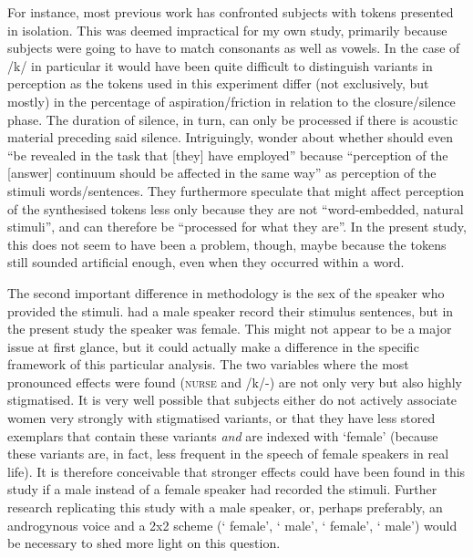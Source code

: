 For instance, most previous work has confronted subjects with   tokens presented in isolation.
This was deemed impractical for my own study, primarily because subjects were going to have to match consonants as well as vowels.
In the case of /k/ in particular it would have been quite difficult to distinguish variants in perception as the tokens used in this experiment differ (not exclusively, but mostly) in the percentage of aspiration/friction in relation to the closure/silence phase.
The duration of silence, in turn, can only be processed if there is acoustic material preceding said silence.
Intriguingly, \textcite[887--888]{haydrager2010} wonder about whether  should even ``be revealed in the task that [they] have employed'' because ``perception of the [answer] continuum should be affected in the same way'' as perception of the stimuli words/sentences.
They furthermore speculate that  might affect perception of the synthesised tokens less only because they are not ``word-embedded, natural stimuli'', and can therefore be ``processed for what they are''.
In the present study, this does not seem to have been a problem, though, maybe because the  tokens still sounded artificial enough, even when they occurred within a word.

The second important difference in methodology is the sex of the speaker who provided the stimuli.
\textcite{hayetal2006a,haydrager2010} had a male speaker record their stimulus sentences, but in the present study the speaker was female.
This might not appear to be a major issue at first glance, but it could actually make a difference in the specific framework of this particular analysis.
The two variables where the most pronounced  effects were found (\textsc{nurse} and /k/-) are not only very  but also highly stigmatised.
It is very well possible that subjects either do not actively associate women very strongly with stigmatised variants, or that they have less stored exemplars that contain these variants \emph{and} are indexed with `female' (because these variants are, in fact, less frequent in the speech of female speakers in real life).
It is therefore conceivable that stronger  effects could have been found in this study if a male instead of a female speaker had recorded the stimuli.
Further research replicating this study with a male speaker, or, perhaps preferably, an androgynous voice and a 2x2  scheme (` female', ` male', ` female', ` male') would be necessary to shed more light on this question.

